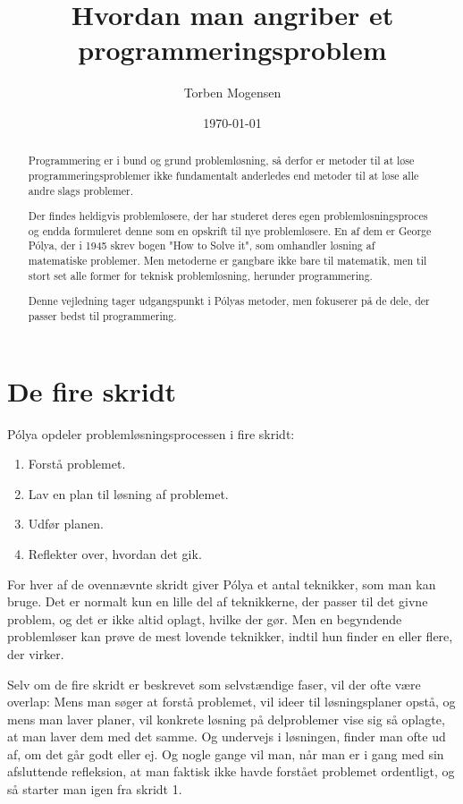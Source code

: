 \documentclass[a4paper,12pt]{article}
\title{Hvordan man angriber et programmeringsproblem}
\author{Torben Mogensen}
\date{\today}
\begin{document}
\maketitle

\begin{abstract}

\noindent
Programmering er i bund og grund problemløsning, så derfor er metoder
til at løse programmeringsproblemer ikke fundamentalt anderledes end
metoder til at løse alle andre slags problemer.

Der findes heldigvis problemløsere, der har studeret deres egen
problemløsningsproces og endda formuleret denne som en opskrift til
nye problemløsere. En af dem er George Pólya, der i 1945 skrev bogen
"How to Solve it", som omhandler løsning af matematiske problemer.
Men metoderne er gangbare ikke bare til matematik, men til stort set
alle former for teknisk problemløsning, herunder programmering.

Denne vejledning tager udgangspunkt i Pólyas metoder, men fokuserer på
de dele, der passer bedst til programmering.
\end{abstract}


\section*{De fire skridt}

Pólya opdeler problemløsningsprocessen i fire skridt:

\begin{enumerate}
\item Forstå problemet.
\item Lav en plan til løsning af problemet.
\item Udfør planen.
\item Reflekter over, hvordan det gik.
\end{enumerate}

\noindent
For hver af de ovennævnte skridt giver Pólya et antal teknikker, som
man kan bruge. Det er normalt kun en lille del af teknikkerne, der
passer til det givne problem, og det er ikke altid oplagt, hvilke der
gør. Men en begyndende problemløser kan prøve de mest lovende
teknikker, indtil hun finder en eller flere, der virker.

Selv om de fire skridt er beskrevet som selvstændige faser, vil der
ofte være overlap: Mens man søger at forstå problemet, vil ideer til
løsningsplaner opstå, og mens man laver planer, vil konkrete løsning
på delproblemer vise sig så oplagte, at man laver dem med det samme.
Og undervejs i løsningen, finder man ofte ud af, om det går godt eller
ej.  Og nogle gange vil man, når man er i gang med sin afsluttende
refleksion, at man faktisk ikke havde forstået problemet ordentligt,
og så starter man igen fra skridt 1.
\end{document}
